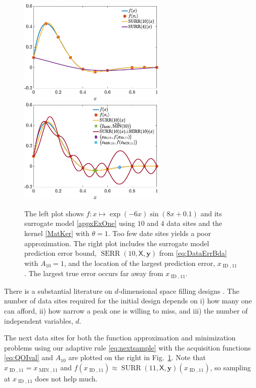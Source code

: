 \documentclass[11pt]{NSFamsart}
\DeclareMathOperator{\SURR}{SURR}
\DeclareMathOperator{\MIN}{MIN}
\DeclareMathOperator{\ID}{ID}
\DeclareMathOperator{\SURRERR}{SERR}
\newcommand{\mX}{\mathsf{X}}
\newcommand{\by}{{\boldsymbol{y}}}
\begin{document}
\begin{figure}
    \centering
    \includegraphics[width = 7cm]{ProgramsImages/fandDataAndAppxSmall.eps} \qquad \qquad
    \includegraphics[width = 7cm]{ProgramsImages/fandDataAndAppxAndRMSPEAndMin.eps}
    \caption{The left plot shows $f: x \mapsto \exp(-6x) \sin(8x+0.1)$ and its surrogate model \eqref{appxExOne} using $10$ and $4$ data sites and the kernel \eqref{MatKer} with $\theta = 1$. Too few date sites yields a poor approximation.  The right plot includes the surrogate model prediction error bound, $\SURRERR(10,\mX,\by)$ from \eqref{eq:DataErrBda} with $A_{10} =1$, and the location of the largest prediction error, $x_{\ID,11}$. The largest true error occurs far away from $x_{\ID,11}$.}
    \label{fig:sampleFun}
\end{figure}

There is a substantial literature on $d$-dimensional space filling designs \cite{FangEtal19a, Jos16a, SanWilNot03}. The number of data sites required for the initial design depends on i) how many one can afford, ii) how narrow a peak one is willing to miss, and iii) the number of independent variables, $d$.

The next data sites for both the function approximation and minimization problems using our adaptive rule \eqref{eq:nextsample} with the acquisition functions \eqref{eq:QOIval} and $A_{10}$ are plotted on the right in Fig.\ \ref{fig:sampleFun}.  Note that $x_{\ID, 11} = x_{\MIN, 11}$ and $f(x_{\ID, 11}) \approx \SURR(11,\mX,\by)(x_{\ID, 11})$, so  sampling at $x_{\ID, 11}$ does not help much.  
\end{document}
